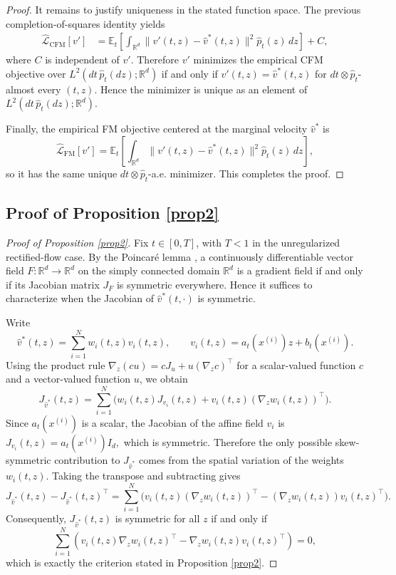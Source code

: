 \documentclass[a4paper,11pt]{article}
\newcommand{\R}{\mathbb{R}}
\theoremstyle{plain}
\theoremstyle{definition}
\begin{document}
\begin{proof}
It remains to justify uniqueness in the stated function space. The previous completion-of-squares identity yields
\[
\begin{aligned}
    \widehat{\mathcal L}_{\mathrm{CFM}}[v']
    &=
    \mathbb E_t\left[
    \int_{\mathbb R^d}
    \|v'(t,z)-\hat v^\ast(t,z)\|^2\hat p_t(z)\,dz
    \right]
    +
    C,
\end{aligned}
\]
where \(C\) is independent of \(v'\). Therefore \(v'\) minimizes the empirical CFM objective over
\(L^2(dt\,\hat p_t(dz);\mathbb R^d)\) if and only if
\(
    v'(t,z)=\hat v^\ast(t,z)
\)
for \(dt\otimes\hat p_t\)-almost every \((t,z)\). Hence the minimizer is unique as an element of
\(L^2(dt\,\hat p_t(dz);\mathbb R^d)\).

Finally, the empirical FM objective centered at the marginal velocity \(\hat v^\ast\) is
\[
    \widehat{\mathcal L}_{\mathrm{FM}}[v']
    =
    \mathbb E_t\left[
    \int_{\mathbb R^d}
    \|v'(t,z)-\hat v^\ast(t,z)\|^2\hat p_t(z)\,dz
    \right],
\]
so it has the same unique \(dt\otimes\hat p_t\)-a.e. minimizer. This completes the proof.
\end{proof}


\subsection{Proof of Proposition \ref{prop2}}
\begin{proof}[Proof of Proposition \ref{prop2}]
Fix \(t\in[0,T]\), with \(T<1\) in the unregularized rectified-flow case.  By the Poincar\'e lemma \cite{charles2022iterated}, a continuously differentiable vector field $F:\R^d\to\R^d$ on the simply connected domain $\R^d$ is a gradient field if and only if its Jacobian matrix $J_F$ is symmetric everywhere. Hence it suffices to characterize when the Jacobian of $\hat v^*(t,\cdot)$ is symmetric.

Write
\[
\hat v^*(t,z)=\sum_{i=1}^N w_i(t,z)v_i(t,z),
\qquad
v_i(t,z)=a_t(x^{(i)})z+b_t(x^{(i)}).
\]
Using the product rule $\nabla_z(cu)=cJ_u+u(\nabla_z c)^\top$ for a scalar-valued function $c$ and a vector-valued function $u$, we obtain
\[
J_{\hat v^*}(t,z)=\sum_{i=1}^N\Big(w_i(t,z)J_{v_i}(t,z)+v_i(t,z)(\nabla_z w_i(t,z))^\top\Big).
\]
Since $a_t(x^{(i)})$ is a scalar, the Jacobian of the affine field $v_i$ is
\(
J_{v_i}(t,z)=a_t(x^{(i)})I_d,
\)
which is symmetric. Therefore the only possible skew-symmetric contribution to $J_{\hat v^*}$ comes from the spatial variation of the weights $w_i(t,z)$. Taking the transpose and subtracting gives
\[
J_{\hat v^*}(t,z)-J_{\hat v^*}(t,z)^\top
=\sum_{i=1}^N\Big(v_i(t,z)(\nabla_z w_i(t,z))^\top-(\nabla_z w_i(t,z))v_i(t,z)^\top\Big).
\]
Consequently, $J_{\hat v^*}(t,z)$ is symmetric for all $z$ if and only if
$$\sum_{i=1}^N \left( v_i(t, z) \nabla_z w_i(t, z)^\top - \nabla_z w_i(t, z) v_i(t, z)^\top \right) = 0,$$
which is exactly the criterion stated in Proposition \ref{prop2}.
\end{proof}
\end{document}
